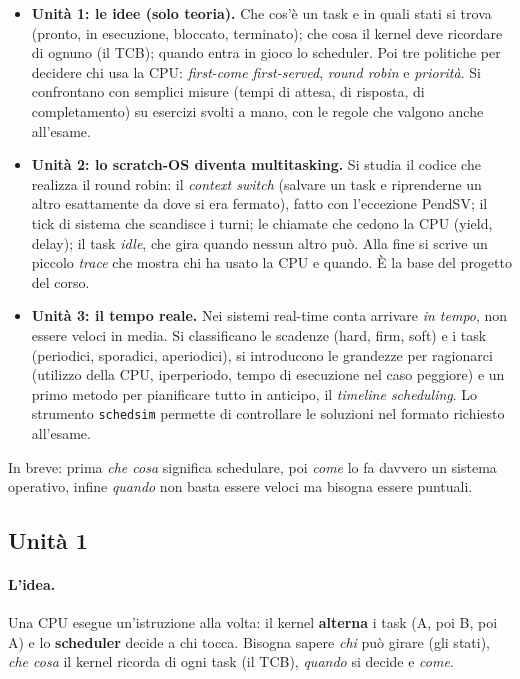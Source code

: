 \begin{itemize}
    \item \textbf{Unità 1: le idee (solo teoria).} Che cos'è un task e in quali stati si trova (pronto, in esecuzione, bloccato, terminato); che cosa il kernel deve ricordare di ognuno (il TCB); quando entra in gioco lo scheduler. Poi tre politiche per decidere chi usa la CPU: \emph{first-come first-served}, \emph{round robin} e \emph{priorità}. Si confrontano con semplici misure (tempi di attesa, di risposta, di completamento) su esercizi svolti a mano, con le regole che valgono anche all'esame.
    \item \textbf{Unità 2: lo scratch-OS diventa multitasking.} Si studia il codice che realizza il round robin: il \emph{context switch} (salvare un task e riprenderne un altro esattamente da dove si era fermato), fatto con l'eccezione PendSV; il tick di sistema che scandisce i turni; le chiamate che cedono la CPU (yield, delay); il task \emph{idle}, che gira quando nessun altro può. Alla fine si scrive un piccolo \emph{trace} che mostra chi ha usato la CPU e quando. È la base del progetto del corso.
    \item \textbf{Unità 3: il tempo reale.} Nei sistemi real-time conta arrivare \emph{in tempo}, non essere veloci in media. Si classificano le scadenze (hard, firm, soft) e i task (periodici, sporadici, aperiodici), si introducono le grandezze per ragionarci (utilizzo della CPU, iperperiodo, tempo di esecuzione nel caso peggiore) e un primo metodo per pianificare tutto in anticipo, il \emph{timeline scheduling}. Lo strumento \texttt{schedsim} permette di controllare le soluzioni nel formato richiesto all'esame.
\end{itemize}

In breve: prima \emph{che cosa} significa schedulare, poi \emph{come} lo fa davvero un sistema operativo, infine \emph{quando} non basta essere veloci ma bisogna essere puntuali.


\subsection{Unità 1}

\paragraph*{L'idea.} Una CPU esegue un'istruzione alla volta: il kernel \textbf{alterna} i task (A, poi B, poi A) e lo \textbf{scheduler} decide a chi tocca. Bisogna sapere \emph{chi} può girare (gli stati), \emph{che cosa} il kernel ricorda di ogni task (il TCB), \emph{quando} si decide e \emph{come}.

